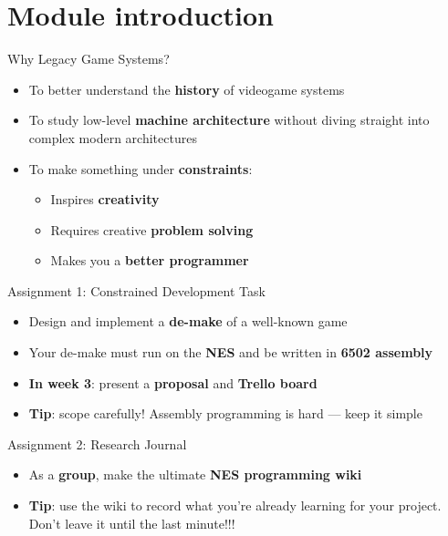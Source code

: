 \part{Module introduction}
\frame{\partpage}

\begin{frame}{Why Legacy Game Systems?}
	\begin{itemize}
		\pause\item To better understand the \textbf{history} of videogame systems
		\pause\item To study low-level \textbf{machine architecture}
			without diving straight into complex modern architectures
		\pause\item To make something under \textbf{constraints}:
			\begin{itemize}
				\pause\item Inspires \textbf{creativity}
				\pause\item Requires creative \textbf{problem solving}
				\pause\item Makes you a \textbf{better programmer}
			\end{itemize}
	\end{itemize}
\end{frame}

\begin{frame}{Assignment 1: Constrained Development Task}
	\begin{itemize}
		\pause\item Design and implement a \textbf{de-make} of a well-known game
		\pause\item Your de-make must run on the \textbf{NES} and be written in \textbf{6502 assembly}
		\pause\item \textbf{In week 3}: present a \textbf{proposal} and \textbf{Trello board}
		\pause\item \textbf{Tip}: scope carefully! Assembly programming is hard --- keep it simple
	\end{itemize}
\end{frame}

\begin{frame}{Assignment 2: Research Journal}
	\begin{itemize}
		\pause\item As a \textbf{group}, make the ultimate \textbf{NES programming wiki}
		\pause\item \textbf{Tip}: use the wiki to record what you're already learning for your project.
			Don't leave it until the last minute!!!
	\end{itemize}
\end{frame}

